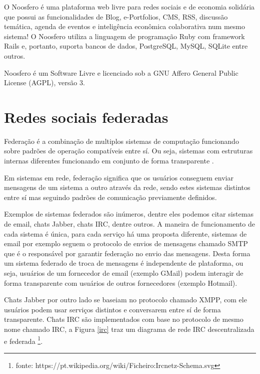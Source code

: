 \documentclass[12pt]{article}
\begin{document}
O Noosfero\cite{noosfero} é uma plataforma web livre para redes sociais e de
economia solidária que possui as funcionalidades de Blog, e-Portfolios, CMS,
RSS, discussão temática, agenda de eventos e inteligência econômica
colaborativa num mesmo sistema! O Noosfero utiliza a linguagem de programação
Ruby com framework Rails e, portanto, suporta bancos de dados, PostgreSQL,
MySQL, SQLite entre outros.

Noosfero é um Software Livre e licenciado sob a GNU Affero General Public
License (AGPL), versão 3.

\section{Redes sociais federadas}

Federação é a combinação de multiplos sistemas de computação funcionando sobre
padrões de operação compatíveis entre sí. Ou seja, sistemas com estruturas
internas diferentes funcionando em conjunto de forma transparente
\cite{federacao}.

Em sistemas em rede, federação significa que os usuários conseguem enviar
mensagens de um sistema a outro através da rede, sendo estes sistemas
distintos entre sí mas seguindo padrões de comunicação previamente definidos.

Exemplos de sistemas federados são inúmeros, dentre eles podemos citar
sistemas de email, chats Jabber, chats IRC, dentre outros. A maneira de
funcionamento de cada sistema é única, para cada serviço há uma proposta
diferente, sistemas de email por exemplo seguem o protocolo de envios de
mensagens chamado SMTP\cite{smtp} que é o responsável por garantir federação
no envio das mensagens. Desta forma um sistema federado de troca de
mensagens é independente de plataforma, ou seja, usuários de um fornecedor de
email (exemplo GMail) podem interagir de forma transparente com usuários de
outros fornecedores (exemplo Hotmail).

Chats Jabber por outro lado se baseiam no protocolo chamado XMPP\cite{xmpp},
com ele usuários podem usar serviços distintos e conversarem entre sí de forma
transparente. Chats IRC são implementados com base no protocolo de mesmo nome
chamado IRC\cite{irc}, a Figura \ref{irc} traz um diagrama de rede IRC
descentralizada e federada
\footnote{fonte: https://pt.wikipedia.org/wiki/Ficheiro:Ircnetz-Schema.svg}.
\end{document}
